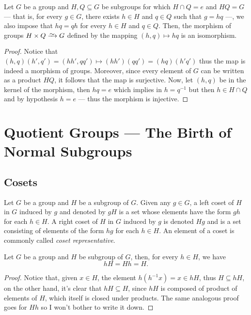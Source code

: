 \begin{proposition}
\label{prop:product-subgroups-isomorphism}
Let \(G\) be a group and \(H, Q \subseteq G\) be subgroups for which \(H \cap Q
= e\) and \(H Q = G\) --- that is, for every \(g \in G\), there exists \(h \in
H\) and \(q \in Q\) such that \(g = h q\) ---, we also impose that \(h q = q h\)
for every \(h \in H\) and \(q \in Q\). Then, the morphism of groups \(H \times Q
\isoto G\) defined by the mapping \((h, q) \mapsto hq\) is an isomorphism.
\end{proposition}

\begin{proof}
Notice that \((h, q)(h', q') = (h h', q q') \mapsto (hh')(qq') = (hq)(h'q')\)
thus the map is indeed a morphism of groups. Moreover, since every element of
\(G\) can be written as a product \(HQ\), it follows that the map is
surjective. Now, let \((h, q)\) be in the kernel of the morphism, then \(hq =
e\) which implies in \(h = q^{-1}\) but then \(h \in H \cap Q\) and by
hypothesis \(h = e\) --- thus the morphism is injective.
\end{proof}

\section{Quotient Groups --- The Birth of Normal Subgroups}

\subsection{Cosets}

\begin{definition}[Coset]
\label{def:coset}
Let \(G\) be a group and \(H\) be a subgroup of \(G\). Given any \(g \in G\), a
left coset of \(H\) in \(G\) induced by \(g\) and denoted by \(g H\) is a set
whose elements have the form \(g h\) for each \(h \in H\). A right coset of
\(H\) in \(G\) induced by \(g\) is denoted \(H g\) and is a set consisting of
elements of the form \(h g\) for each \(h \in H\). An element of a coset is
commonly called \emph{coset representative}.
\end{definition}

\begin{corollary}
Let \(G\) be a group and \(H\) be subgroup of \(G\), then, for every \(h \in
H\), we have
\[
    h H = H h = H.
\]
\end{corollary}

\begin{proof}
Notice that, given \(x \in H\), the element \(h (h^{-1} x) = x \in h H\), thus
\(H \subseteq h H\), on the other hand, it's clear that \(hH \subseteq H\),
since \(hH\) is composed of product of elements of \(H\), which itself is closed
under products. The same analogous proof goes for \(Hh\) so I won't bother to
write it down.
\end{proof}

